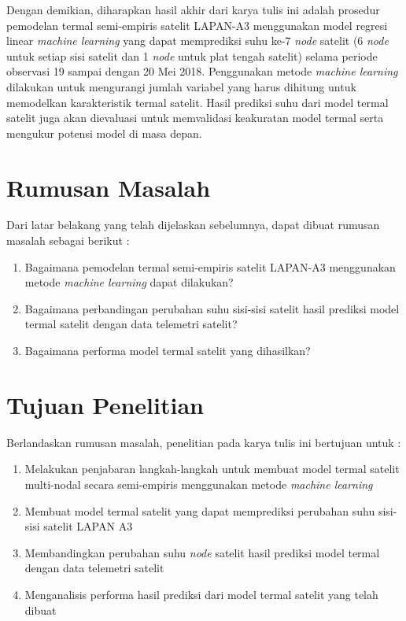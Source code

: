 Dengan demikian, diharapkan hasil akhir dari karya tulis ini adalah prosedur
pemodelan termal semi-empiris satelit LAPAN-A3 menggunakan model regresi linear
\textit{machine learning} yang dapat memprediksi suhu ke-7 \textit{node} satelit (6 \textit{node} untuk
setiap sisi satelit dan 1 \textit{node} untuk plat tengah satelit) selama periode
observasi 19 sampai dengan 20 Mei 2018. Penggunakan metode \textit{machine learning}
dilakukan untuk mengurangi jumlah variabel yang harus dihitung untuk memodelkan
karakteristik termal satelit. Hasil prediksi suhu dari model termal satelit
juga akan dievaluasi untuk memvalidasi keakuratan model termal serta mengukur
potensi model di masa depan.

\section{Rumusan Masalah}

Dari latar belakang yang telah dijelaskan sebelumnya, dapat dibuat rumusan masalah sebagai berikut :

\begin{enumerate}
\item Bagaimana pemodelan termal semi-empiris satelit LAPAN-A3 menggunakan metode \textit{machine learning} dapat dilakukan?
\item Bagaimana perbandingan perubahan suhu sisi-sisi satelit hasil prediksi model termal satelit dengan data telemetri satelit?
\item Bagaimana performa model termal satelit yang dihasilkan?
\end{enumerate}

\section{Tujuan Penelitian}

Berlandaskan rumusan masalah, penelitian pada karya tulis ini bertujuan untuk :

\begin{enumerate}
\item Melakukan penjabaran langkah-langkah untuk membuat model termal satelit multi-nodal secara semi-empiris menggunakan metode \textit{machine learning}
\item Membuat model termal satelit yang dapat memprediksi perubahan suhu sisi-sisi satelit LAPAN A3
\item Membandingkan perubahan suhu \textit{node} satelit hasil prediksi model termal dengan data telemetri satelit
\item Menganalisis performa hasil prediksi dari model termal satelit yang telah dibuat
\end{enumerate}

